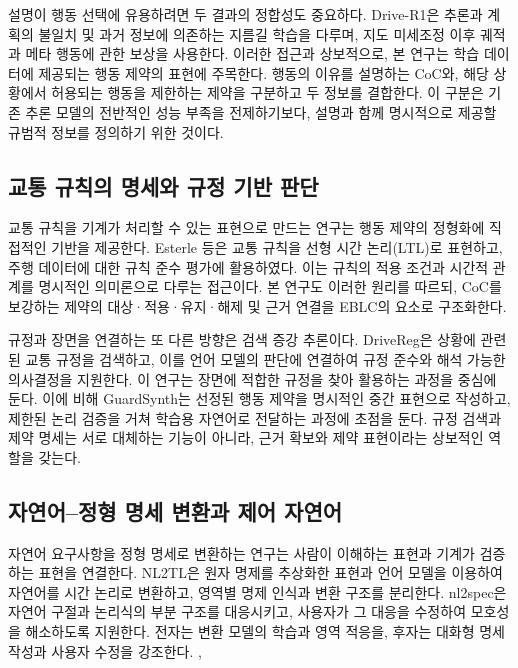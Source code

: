\documentclass[10pt,a4paper,twocolumn]{article}\usepackage[margin=18mm]{geometry}\usepackage{fontspec,kotex}
\begin{document}
설명이 행동 선택에 유용하려면 두 결과의 정합성도 중요하다. Drive-R1은 추론과 계획의 불일치 및 과거 정보에 의존하는 지름길 학습을 다루며, 지도 미세조정 이후 궤적과 메타 행동에 관한 보상을 사용한다. 이러한 접근과 상보적으로, 본 연구는 학습 데이터에 제공되는 행동 제약의 표현에 주목한다. 행동의 이유를 설명하는 CoC와, 해당 상황에서 허용되는 행동을 제한하는 제약을 구분하고 두 정보를 결합한다. 이 구분은 기존 추론 모델의 전반적인 성능 부족을 전제하기보다, 설명과 함께 명시적으로 제공할 규범적 정보를 정의하기 위한 것이다. \cite{r5}\par

\subsection{교통 규칙의 명세와 규정 기반 판단}

교통 규칙을 기계가 처리할 수 있는 표현으로 만드는 연구는 행동 제약의 정형화에 직접적인 기반을 제공한다. Esterle 등은 교통 규칙을 선형 시간 논리(LTL)로 표현하고, 주행 데이터에 대한 규칙 준수 평가에 활용하였다. 이는 규칙의 적용 조건과 시간적 관계를 명시적인 의미론으로 다루는 접근이다. 본 연구도 이러한 원리를 따르되, CoC를 보강하는 제약의 대상·적용·유지·해제 및 근거 연결을 EBLC의 요소로 구조화한다. \cite{r6}\par

규정과 장면을 연결하는 또 다른 방향은 검색 증강 추론이다. DriveReg은 상황에 관련된 교통 규정을 검색하고, 이를 언어 모델의 판단에 연결하여 규정 준수와 해석 가능한 의사결정을 지원한다. 이 연구는 장면에 적합한 규정을 찾아 활용하는 과정을 중심에 둔다. 이에 비해 GuardSynth는 선정된 행동 제약을 명시적인 중간 표현으로 작성하고, 제한된 논리 검증을 거쳐 학습용 자연어로 전달하는 과정에 초점을 둔다. 규정 검색과 제약 명세는 서로 대체하는 기능이 아니라, 근거 확보와 제약 표현이라는 상보적인 역할을 갖는다. \cite{r7}\par

\subsection{자연어--정형 명세 변환과 제어 자연어}

자연어 요구사항을 정형 명세로 변환하는 연구는 사람이 이해하는 표현과 기계가 검증하는 표현을 연결한다. NL2TL은 원자 명제를 추상화한 표현과 언어 모델을 이용하여 자연어를 시간 논리로 변환하고, 영역별 명제 인식과 변환 구조를 분리한다. nl2spec은 자연어 구절과 논리식의 부분 구조를 대응시키고, 사용자가 그 대응을 수정하여 모호성을 해소하도록 지원한다. 전자는 변환 모델의 학습과 영역 적응을, 후자는 대화형 명세 작성과 사용자 수정을 강조한다. \cite{r8}, \cite{r9}\par
\end{document}
